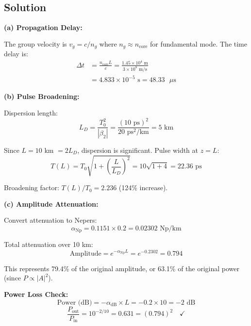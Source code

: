 \documentclass[12pt,a4paper]{article}
\begin{document}
\subsection{Solution}

\textbf{(a) Propagation Delay:}

The group velocity is $v_g = c/n_g$ where $n_g \approx n_{\text{core}}$ for fundamental mode. The time delay is:
\begin{align}
\Delta t &= \frac{n_{\text{core}} L}{c} = \frac{1.45 \times 10^4 \text{ m}}{3 \times 10^8 \text{ m/s}} \nonumber\\
&= 4.833 \times 10^{-5} \text{ s} = \boxed{48.33 \text{ }\mu\text{s}}
\end{align}

\textbf{(b) Pulse Broadening:}

Dispersion length:
\begin{equation}
L_D = \frac{T_0^2}{|\beta_2|} = \frac{(10 \text{ ps})^2}{20 \text{ ps}^2/\text{km}} = \boxed{5 \text{ km}}
\end{equation}

Since $L = 10$ km $= 2 L_D$, dispersion is significant. Pulse width at $z = L$:
\begin{equation}
T(L) = T_0\sqrt{1 + \left(\frac{L}{L_D}\right)^2} = 10\sqrt{1 + 4} = \boxed{22.36 \text{ ps}}
\end{equation}

Broadening factor: $T(L)/T_0 = 2.236$ (124\% increase).

\textbf{(c) Amplitude Attenuation:}

Convert attenuation to Nepers:
\begin{equation}
\alpha_{\text{Np}} = 0.1151 \times 0.2 = 0.02302 \text{ Np/km}
\end{equation}

Total attenuation over 10 km:
\begin{equation}
\text{Amplitude} = e^{-\alpha_{\text{Np}} L} = e^{-0.2302} = \boxed{0.794}
\end{equation}

This represents 79.4\% of the original amplitude, or 63.1\% of the original power (since $P \propto |A|^2$).

\textbf{Power Loss Check:}
\begin{equation}
\text{Power (dB)} = -\alpha_{\text{dB}} \times L = -0.2 \times 10 = -2 \text{ dB}
\end{equation}
\begin{equation}
\frac{P_{\text{out}}}{P_{\text{in}}} = 10^{-2/10} = 0.631 = (0.794)^2 \quad \checkmark
\end{equation}
\end{document}
